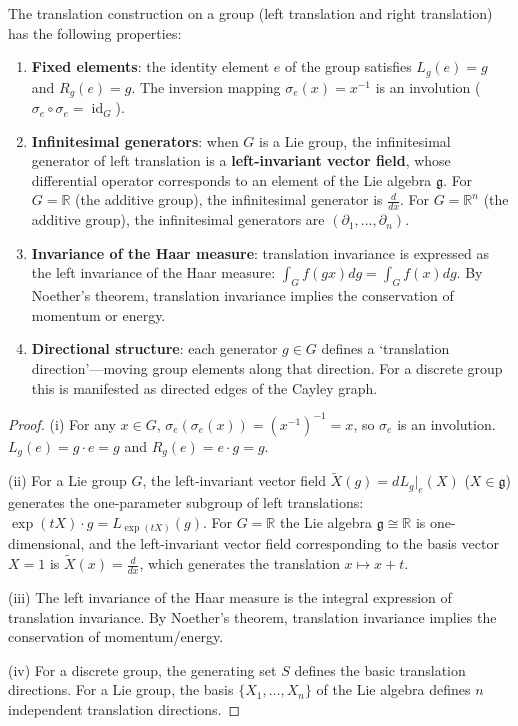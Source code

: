 \begin{proposition}\label{prop:translation_operator}
The translation construction on a group (left translation and right translation) has the following properties:
\begin{enumerate}[label=(\roman*)]
    \item \textbf{Fixed elements}: the identity element $e$ of the group satisfies $L_g(e) = g$ and $R_g(e) = g$. The inversion mapping $\sigma_e(x) = x^{-1}$ is an involution ($\sigma_e \circ \sigma_e = \operatorname{id}_G$).
    \item \textbf{Infinitesimal generators}: when $G$ is a Lie group, the infinitesimal generator of left translation is a \textbf{left-invariant vector field}, whose differential operator corresponds to an element of the Lie algebra $\mathfrak{g}$. For $G = \mathbb{R}$ (the additive group), the infinitesimal generator is $\frac{d}{dx}$. For $G = \mathbb{R}^n$ (the additive group), the infinitesimal generators are $(\partial_1, \dots, \partial_n)$.
    \item \textbf{Invariance of the Haar measure}: translation invariance is expressed as the left invariance of the Haar measure: $\int_G f(gx) dg = \int_G f(x) dg$. By Noether's theorem, translation invariance implies the conservation of momentum or energy.
    \item \textbf{Directional structure}: each generator $g \in G$ defines a `translation direction'---moving group elements along that direction. For a discrete group this is manifested as directed edges of the Cayley graph.
\end{enumerate}
\end{proposition}

\begin{proof}
(i) For any $x \in G$, $\sigma_e(\sigma_e(x)) = (x^{-1})^{-1} = x$, so $\sigma_e$ is an involution. $L_g(e) = g \cdot e = g$ and $R_g(e) = e \cdot g = g$.

(ii) For a Lie group $G$, the left-invariant vector field $\tilde{X}(g) = dL_g|_e(X)$ ($X \in \mathfrak{g}$) generates the one-parameter subgroup of left translations: $\exp(tX) \cdot g = L_{\exp(tX)}(g)$. For $G = \mathbb{R}$ the Lie algebra $\mathfrak{g} \cong \mathbb{R}$ is one-dimensional, and the left-invariant vector field corresponding to the basis vector $X = 1$ is $\tilde{X}(x) = \frac{d}{dx}$, which generates the translation $x \mapsto x + t$.

(iii) The left invariance of the Haar measure is the integral expression of translation invariance. By Noether's theorem, translation invariance implies the conservation of momentum/energy.

(iv) For a discrete group, the generating set $S$ defines the basic translation directions. For a Lie group, the basis $\{X_1, \dots, X_n\}$ of the Lie algebra defines $n$ independent translation directions.
\end{proof}

